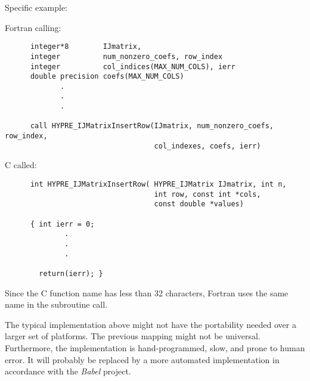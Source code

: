 \noindent Specific example:

\vspace{0.1in}

  Fortran calling:
\begin{verbatim}
      integer*8        IJmatrix, 
      integer          num_nonzero_coefs, row_index
      integer          col_indices(MAX_NUM_COLS), ierr
      double precision coefs(MAX_NUM_COLS)
             .
             .
             .

      call HYPRE_IJMatrixInsertRow(IJmatrix, num_nonzero_coefs, row_index,
                                   col_indexes, coefs, ierr)
\end{verbatim}

\vspace{0.1in}

  C called:
\begin{verbatim}
      int HYPRE_IJMatrixInsertRow( HYPRE_IJMatrix IJmatrix, int n,
                                   int row, const int *cols,
                                   const double *values)     

      { int ierr = 0;
              .
              .
              .

        return(ierr); }
\end{verbatim}

\noindent Since the C function name has less than 32 characters, Fortran uses the
same name in the subroutine call.

The typical implementation above might not have the portability needed
over a larger set of platforms.  The previous mapping might
not be universal.  Furthermore,
the implementation is hand-programmed, slow, and prone to human error.
It will probably be replaced by a more automated implementation in accordance
with the {\slshape Babel} project. 



